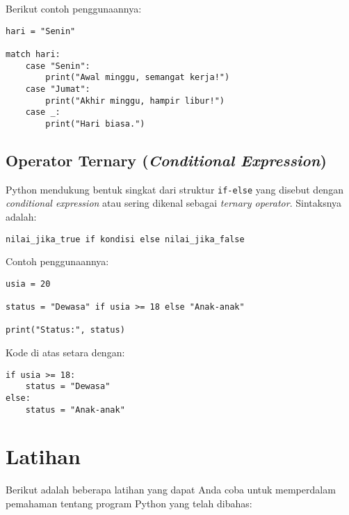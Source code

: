 Berikut contoh penggunaannya:

\begin{lstlisting}[style=PythonStyle, caption={Kode Python: match.py}]
hari = "Senin"

match hari:
    case "Senin":
        print("Awal minggu, semangat kerja!")
    case "Jumat":
        print("Akhir minggu, hampir libur!")
    case _:
        print("Hari biasa.")
\end{lstlisting}

\subsection{Operator Ternary (\textit{Conditional Expression})}

Python mendukung bentuk singkat dari struktur \texttt{if-else} yang disebut dengan
\textit{conditional expression} atau sering dikenal sebagai \textit{ternary operator}.
Sintaksnya adalah:

\begin{lstlisting}[style=PythonStyle, caption={Bentuk dasar ternary operator di Python}]
nilai_jika_true if kondisi else nilai_jika_false
\end{lstlisting}

Contoh penggunaannya:

\begin{lstlisting}[style=PythonStyle, caption={Kode Python: ternary_operator.py}]
usia = 20

status = "Dewasa" if usia >= 18 else "Anak-anak"

print("Status:", status)
\end{lstlisting}

Kode di atas setara dengan:

\begin{lstlisting}[style=PythonStyle]
if usia >= 18:
    status = "Dewasa"
else:
    status = "Anak-anak"
\end{lstlisting}

\section{Latihan}
Berikut adalah beberapa latihan yang dapat Anda coba untuk memperdalam pemahaman tentang program Python yang telah dibahas:

